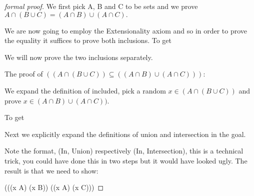 \begin{proof}[formal proof]
We first pick A, B and C to be sets and we prove $ A\cap(B \cup C) = (A \cap B) \cup (A \cap C).$

We are now going to employ the Extensionality axiom and so in order to prove the equality it suffices to prove both inclusions.
To get 


We will now prove the two inclusions separately.

The proof of $((A \cap (B \cup C)) \subseteq ((A \cap B) \cup (A \cap C)))$:

We expand the definition of included, pick a random $x \in (A \cap (B \cup C))$ and prove $x \in (A \cap B) \cup (A \cap C))$. 


To get 


 Next we explicitly expand the definitions of union and intersection  in the goal.
 
 
 Note the format, (In, Union) respectively (In, Intersection), this is a technical trick, you could have done this in two steps but it would have looked ugly. The result is that we need to show:
 
{ (((x \in A) \land (x \in B)) \lor ((x \in A) \land (x \in C)))}


\end{proof}
